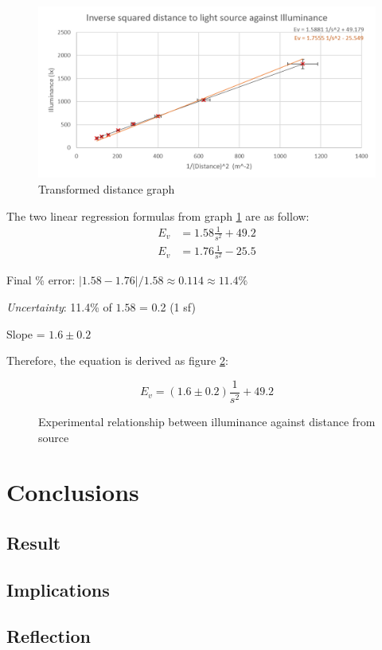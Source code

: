 \documentclass[a4paper,12pt]{article}
\begin{document}
\begin{figure}
    \centering
    \includegraphics[width=\textwidth]{assets/transformgraph.png}
    \caption{Transformed distance graph}
    \label{gph:tdata}
\end{figure}

The two linear regression formulas from graph \ref{gph:tdata} are as follow:
\begin{align*}
    E_v &= 1.58 \frac{1}{s^2} + 49.2\\
    E_v &= 1.76 \frac{1}{s^2} - 25.5
\end{align*}

Final \% error: $|1.58-1.76| / 1.58 \approx 0.114 \approx 11.4\%$

\textit{Uncertainty}: 11.4\% of $1.58$ = 0.2 (1 sf)

Slope = $1.6 \pm 0.2$

Therefore, the equation is derived as figure \ref{fig:rel}:
\begin{figure}[h!]
    \[
       E_v = (1.6 \pm 0.2) \frac{1}{s^2} + 49.2
    \]
    \caption{Experimental relationship between illuminance against distance from source}
    \label{fig:rel}
\end{figure}

\section{Conclusions}
\subsection{Result}
\subsection{Implications}
\subsection{Reflection}


\newpage
\nocite{*}
\printbibliography
\end{document}

